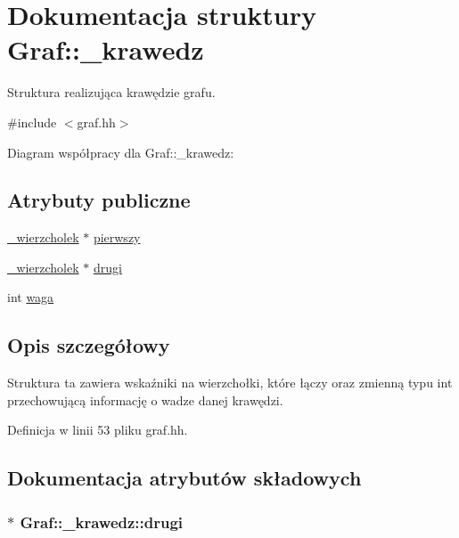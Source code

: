 \hypertarget{struct_graf_1_1__krawedz}{\section{\-Dokumentacja struktury \-Graf\-:\-:\-\_\-krawedz}
\label{struct_graf_1_1__krawedz}
}


\-Struktura realizująca krawędzie grafu.  




{\ttfamily \#include $<$graf.\-hh$>$}



\-Diagram współpracy dla \-Graf\-:\-:\-\_\-krawedz\-:
\subsection*{\-Atrybuty publiczne}
\begin{DoxyCompactItemize}
\item 
\hyperlink{struct_graf_1_1__wierzcholek}{\-\_\-wierzcholek} $\ast$ \hyperlink{struct_graf_1_1__krawedz_adba487ff1b27ab413c139dff7ef02313}{pierwszy}
\item 
\hyperlink{struct_graf_1_1__wierzcholek}{\-\_\-wierzcholek} $\ast$ \hyperlink{struct_graf_1_1__krawedz_a089375425bc7f1cb193f02f7bae87e4a}{drugi}
\item 
int \hyperlink{struct_graf_1_1__krawedz_a32556165c01ba902034186551780c7f4}{waga}
\end{DoxyCompactItemize}


\subsection{\-Opis szczegółowy}
\-Struktura ta zawiera wskaźniki na wierzchołki, które łączy oraz zmienną typu int przechowującą informację o wadze danej krawędzi. 

\-Definicja w linii 53 pliku graf.\-hh.



\subsection{\-Dokumentacja atrybutów składowych}
\hypertarget{struct_graf_1_1__krawedz_a089375425bc7f1cb193f02f7bae87e4a}{
\subsubsection[{drugi}]{$\ast$ {\bf \-Graf\-::\-\_\-krawedz\-::drugi}}}\label{struct_graf_1_1__krawedz_a089375425bc7f1cb193f02f7bae87e4a}


